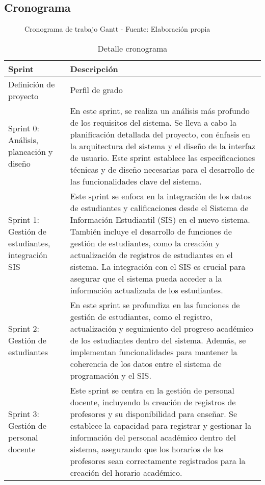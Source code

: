 \subsection{Cronograma}

\begin{figure}[H]
    \centering
    \caption{Cronograma de trabajo Gantt - Fuente: Elaboración propia} \label{fig:chronogram}
\end{figure}

\begin{longtable}{p{3in}|p{3in}}
\caption{Detalle cronograma} \label{tab:chronogram} \\
\hline
\endfirsthead
\hline
\textbf{Sprint} & \textbf{Descripción} \\
\hline
\endhead
\hline
\endfoot

\hline
Definición de proyecto & Perfil de grado \\
\hline

Sprint 0: Análisis, planeación y diseño & 
En este sprint, se realiza un análisis más profundo de los requisitos del sistema. Se lleva a cabo la planificación detallada del proyecto, con énfasis en la arquitectura del sistema y el diseño de la interfaz de usuario. Este sprint establece las especificaciones técnicas y de diseño necesarias para el desarrollo de las funcionalidades clave del sistema. \\
\hline

Sprint 1: Gestión de estudiantes, integración SIS & 
Este sprint se enfoca en la integración de los datos de estudiantes y calificaciones desde el Sistema de Información Estudiantil (SIS) en el nuevo sistema. También incluye el desarrollo de funciones de gestión de estudiantes, como la creación y actualización de registros de estudiantes en el sistema. La integración con el SIS es crucial para asegurar que el sistema pueda acceder a la información actualizada de los estudiantes. \\
\hline

Sprint 2: Gestión de estudiantes & 
En este sprint se profundiza en las funciones de gestión de estudiantes, como el registro, actualización y seguimiento del progreso académico de los estudiantes dentro del sistema. Además, se implementan funcionalidades para mantener la coherencia de los datos entre el sistema de programación y el SIS. \\
\hline

Sprint 3: Gestión de personal docente & 
Este sprint se centra en la gestión de personal docente, incluyendo la creación de registros de profesores y su disponibilidad para enseñar. Se establece la capacidad para registrar y gestionar la información del personal académico dentro del sistema, asegurando que los horarios de los profesores sean correctamente registrados para la creación del horario académico. \\
\hline


\end{longtable}

